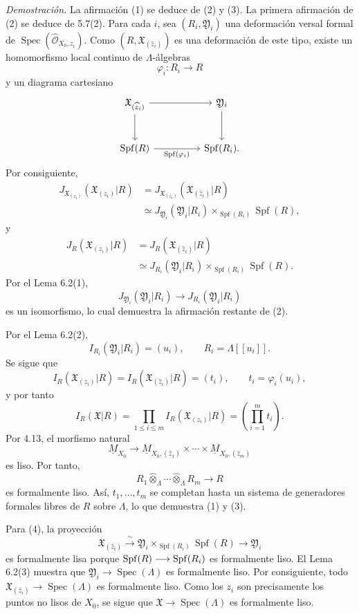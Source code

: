 \smallskip
\noindent\textit{Demostración.}
La afirmación (1) se deduce de (2) y (3). La primera afirmación de (2)
se deduce de 5.7(2). Para cada $i$, sea $(R_i,\mathfrak Y_i)$ una
deformación versal formal de
$\operatorname{Spec}(\widehat{\mathcal O}_{X_0,z_i})$. Como
$(R,\mathfrak X_{(\widehat z_i)})$ es una deformación de este tipo,
existe un homomorfismo local continuo de $\Lambda$-álgebras
\[
\varphi_i:R_i\longrightarrow R
\]
y un diagrama cartesiano
\[
\begin{tikzcd}[column sep=huge,row sep=large]
\mathfrak X_{(\widehat z_i)}
  \arrow[r] \arrow[d]
& \mathfrak Y_i \arrow[d]\\
\operatorname{Spf}(R)
  \arrow[r,"{\operatorname{Spf}(\varphi_i)}"']
& \operatorname{Spf}(R_i).
\end{tikzcd}
\]
Por consiguiente,
\[
\begin{aligned}
J_{\mathfrak X_{(z_i)}}(\mathfrak X_{(z_i)}|R)
&=J_{\mathfrak X_{(\widehat z_i)}}
   (\mathfrak X_{(\widehat z_i)}|R)\\
&\simeq
J_{\mathfrak Y_i}(\mathfrak Y_i|R_i)
 \times_{\operatorname{Spf}(R_i)}\operatorname{Spf}(R),
\end{aligned}
\]
y
\[
\begin{aligned}
J_R(\mathfrak X_{(z_i)}|R)
&=J_R(\mathfrak X_{(\widehat z_i)}|R)\\
&\simeq
J_{R_i}(\mathfrak Y_i|R_i)
 \times_{\operatorname{Spf}(R_i)}\operatorname{Spf}(R).
\end{aligned}
\]
Por el Lema 6.2(1),
\[
J_{\mathfrak Y_i}(\mathfrak Y_i|R_i)
 \longrightarrow J_{R_i}(\mathfrak Y_i|R_i)
\]
es un isomorfismo, lo cual demuestra la afirmación restante de (2).

Por el Lema 6.2(2),
\[
I_{R_i}(\mathfrak Y_i|R_i)=(u_i),
\qquad R_i=\Lambda[[u_i]].
\]
Se sigue que
\[
I_R(\mathfrak X_{(z_i)}|R)
=I_R(\mathfrak X_{(\widehat z_i)}|R)
=(t_i),
\qquad t_i=\varphi_i(u_i),
\]
y por tanto
\[
I_R(\mathfrak X|R)
=\prod_{1\leq i\leq m}I_R(\mathfrak X_{(z_i)}|R)
=\left(\prod_{i=1}^m t_i\right).
\]
Por 4.13, el morfismo natural
\[
\underline M_{X_0}\longrightarrow
\underline M_{X_0,(\widehat z_1)}\times\cdots\times
\underline M_{X_0,(\widehat z_m)}
\]
es liso. Por tanto,
\[
R_1\widehat\otimes_\Lambda\cdots
 \widehat\otimes_\Lambda R_m\longrightarrow R
\]
es formalmente liso. Así, $t_1,\ldots,t_m$ se completan hasta un
sistema de generadores formales libres de $R$ sobre $\Lambda$, lo que
demuestra (1) y (3).


Para (4), la proyección
\[
\mathfrak X_{(\widehat z_i)}
 \xrightarrow{\ \sim\ }
\mathfrak Y_i\times_{\operatorname{Spf}(R_i)}
 \operatorname{Spf}(R)
 \longrightarrow\mathfrak Y_i
\]
es formalmente lisa porque
$\operatorname{Spf}(R)\sisi{\overset{\ \operatorname{Spf}(\varphi_i)\ }{\relbar\joinrel\relbar\joinrel\relbar\joinrel\relbar}}{\longrightarrow}\operatorname{Spf}(R_i)$ es
formalmente liso. El Lema 6.2(3) muestra que
$\mathfrak Y_i\longrightarrow\operatorname{Spec}(\Lambda)$ es
formalmente liso. Por consiguiente, todo
$\mathfrak X_{(\widehat z_i)}\longrightarrow
\operatorname{Spec}(\Lambda)$ es formalmente liso. Como los $z_i$
son precisamente los puntos no lisos de $X_0$, se sigue que
$\mathfrak X\longrightarrow\operatorname{Spec}(\Lambda)$ es
formalmente liso.
